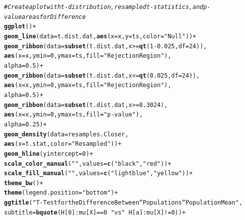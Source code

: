 \documentclass{article}\usepackage[]{graphicx}\usepackage[]{xcolor}
\makeatletter
\newcommand{\hlnum}[1]{\textcolor[rgb]{0.686,0.059,0.569}{#1}}%
\newcommand{\hlsng}[1]{\textcolor[rgb]{0.192,0.494,0.8}{#1}}%
\newcommand{\hlcom}[1]{\textcolor[rgb]{0.678,0.584,0.686}{\textit{#1}}}%
\newcommand{\hlopt}[1]{\textcolor[rgb]{0,0,0}{#1}}%
\newcommand{\hldef}[1]{\textcolor[rgb]{0.345,0.345,0.345}{#1}}%
\newcommand{\hlkwc}[1]{\textcolor[rgb]{0.333,0.667,0.333}{#1}}%
\newcommand{\hlkwd}[1]{\textcolor[rgb]{0.737,0.353,0.396}{\textbf{#1}}}%
\newenvironment{kframe}{%
 \def\at@end@of@kframe{}%
 \ifinner\ifhmode%
  \def\at@end@of@kframe{\end{minipage}}%
  \begin{minipage}{\columnwidth}%
 \fi\fi%
 \def\FrameCommand##1{\hskip\@totalleftmargin \hskip-\fboxsep
 \colorbox{shadecolor}{##1}\hskip-\fboxsep
     \hskip-\linewidth \hskip-\@totalleftmargin \hskip\columnwidth}%
 \MakeFramed {\advance\hsize-\width
   \@totalleftmargin\z@ \linewidth\hsize
   \@setminipage}}%
 {\par\unskip\endMakeFramed%
 \at@end@of@kframe}
\newenvironment{knitrout}{}{} %
\makeatother
\begin{document}
\begin{enumerate}
\begin{enumerate}
\begin{knitrout}
\begin{kframe}
\begin{alltt}
\hlcom{# Create a plot with t-distribution, resampled t-statistics, and p-value areas for Difference}
\hlkwd{ggplot}\hldef{()} \hlopt{+}
  \hlkwd{geom_line}\hldef{(}\hlkwc{data} \hldef{= t.dist.dat,} \hlkwd{aes}\hldef{(}\hlkwc{x} \hldef{= x,} \hlkwc{y} \hldef{= ts,} \hlkwc{color} \hldef{=} \hlsng{"Null"}\hldef{))} \hlopt{+}
  \hlkwd{geom_ribbon}\hldef{(}\hlkwc{data} \hldef{=} \hlkwd{subset}\hldef{(t.dist.dat, x} \hlopt{>=} \hlkwd{qt}\hldef{(}\hlnum{1} \hlopt{-} \hlnum{0.025}\hldef{,} \hlkwc{df} \hldef{=} \hlnum{24}\hldef{)),}
              \hlkwd{aes}\hldef{(}\hlkwc{x} \hldef{= x,} \hlkwc{ymin} \hldef{=} \hlnum{0}\hldef{,} \hlkwc{ymax} \hldef{= ts,} \hlkwc{fill} \hldef{=} \hlsng{"Rejection Region"}\hldef{),}
              \hlkwc{alpha} \hldef{=} \hlnum{0.5}\hldef{)} \hlopt{+}
  \hlkwd{geom_ribbon}\hldef{(}\hlkwc{data} \hldef{=} \hlkwd{subset}\hldef{(t.dist.dat, x} \hlopt{<=} \hlkwd{qt}\hldef{(}\hlnum{0.025}\hldef{,} \hlkwc{df} \hldef{=} \hlnum{24}\hldef{)),}
              \hlkwd{aes}\hldef{(}\hlkwc{x} \hldef{= x,} \hlkwc{ymin} \hldef{=} \hlnum{0}\hldef{,} \hlkwc{ymax} \hldef{= ts,} \hlkwc{fill} \hldef{=} \hlsng{"Rejection Region"}\hldef{),}
              \hlkwc{alpha} \hldef{=} \hlnum{0.5}\hldef{)} \hlopt{+}
  \hlkwd{geom_ribbon}\hldef{(}\hlkwc{data} \hldef{=} \hlkwd{subset}\hldef{(t.dist.dat, x} \hlopt{>=} \hlnum{8.3024}\hldef{),}
              \hlkwd{aes}\hldef{(}\hlkwc{x} \hldef{= x,} \hlkwc{ymin} \hldef{=} \hlnum{0}\hldef{,} \hlkwc{ymax} \hldef{= ts,} \hlkwc{fill} \hldef{=} \hlsng{"p-value"}\hldef{),}
              \hlkwc{alpha} \hldef{=} \hlnum{0.25}\hldef{)} \hlopt{+}
  \hlkwd{geom_density}\hldef{(}\hlkwc{data} \hldef{= resamples.Closer,}
               \hlkwd{aes}\hldef{(}\hlkwc{x} \hldef{= t.stat,} \hlkwc{color} \hldef{=} \hlsng{"Resampled"}\hldef{))} \hlopt{+}
  \hlkwd{geom_hline}\hldef{(}\hlkwc{yintercept} \hldef{=} \hlnum{0}\hldef{)} \hlopt{+}
  \hlkwd{scale_color_manual}\hldef{(}\hlsng{""}\hldef{,} \hlkwc{values} \hldef{=} \hlkwd{c}\hldef{(}\hlsng{"black"}\hldef{,} \hlsng{"red"}\hldef{))} \hlopt{+}
  \hlkwd{scale_fill_manual}\hldef{(}\hlsng{""}\hldef{,} \hlkwc{values} \hldef{=} \hlkwd{c}\hldef{(}\hlsng{"lightblue"}\hldef{,} \hlsng{"yellow"}\hldef{))} \hlopt{+}
  \hlkwd{theme_bw}\hldef{()} \hlopt{+}
  \hlkwd{theme}\hldef{(}\hlkwc{legend.position} \hldef{=} \hlsng{"bottom"}\hldef{)} \hlopt{+}
  \hlkwd{ggtitle}\hldef{(}\hlsng{"T-Test for the Difference Between ``Populations`` Population Mean"}\hldef{,}
          \hlkwc{subtitle} \hldef{=} \hlkwd{bquote}\hldef{(H[}\hlnum{0}\hldef{]}\hlopt{:}\hldef{mu[X]} \hlopt{==} \hlnum{0} \hlopt{~} \hlsng{"vs"} \hlopt{~} \hldef{H[a]}\hlopt{:}\hldef{mu[X]} \hlopt{!=} \hlnum{0}\hldef{))} \hlopt{+}

\end{alltt}
\end{kframe}
\end{knitrout}
\end{enumerate}
\end{enumerate}
\end{document}
